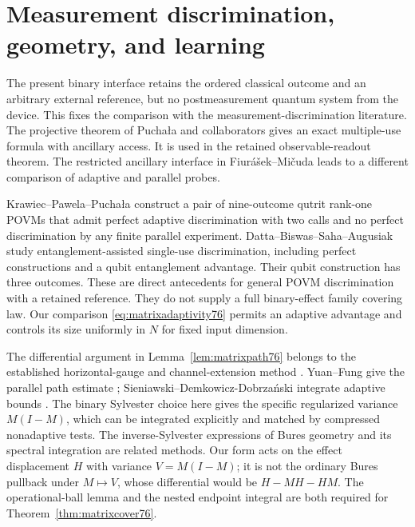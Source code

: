 \section{Measurement discrimination, geometry, and learning}
\label{sec:matrixcomparison76}
The present binary interface retains the ordered classical outcome
and an arbitrary external reference, but no postmeasurement quantum
system from the device. This fixes the comparison with the
measurement-discrimination literature. The projective theorem of
Pucha\l a and collaborators \cite[Corollary~1 and Theorem~2]{PPKKO72}
gives an exact multiple-use formula with ancillary access. It is
used in the retained observable-readout theorem. The restricted
ancillary interface in Fiur\'a\v sek--Mi\v cuda \cite{FM75} leads
to a different comparison of adaptive and parallel probes.

Krawiec--Pawela--Pucha\l a \cite[Section~4]{KPP76} construct a pair
of nine-outcome qutrit rank-one POVMs that admit perfect adaptive
discrimination with two calls and no perfect discrimination by
any finite parallel experiment. Datta--Biswas--Saha--Augusiak
\cite[Theorems~3--5]{DBSA76} study entanglement-assisted
single-use discrimination, including perfect constructions and a
qubit entanglement advantage. Their qubit construction has three
outcomes. These are direct antecedents for general POVM
discrimination with a retained reference. They do not supply a
full binary-effect family covering law. Our comparison
\eqref{eq:matrixadaptivity76} permits an adaptive advantage and
controls its size uniformly in $N$ for fixed input dimension.

The differential argument in Lemma~\ref{lem:matrixpath76} belongs
to the established horizontal-gauge and channel-extension method
\cite{FI76,DKG67,DM76,KGAD76}. Yuan--Fung give the parallel path estimate
\cite[Section~III, equation~(26), PDF version~3]{YF76};
Sieniawski--Demkowicz-Dobrza\'nski integrate adaptive bounds
\cite[Section~IV.A]{SD76}. The binary Sylvester choice here gives the
specific regularized variance $M(I-M)$, which can be integrated
explicitly and matched by compressed nonadaptive tests. The
inverse-Sylvester expressions of Bures geometry
\cite{Dittmann76} and its spectral integration
\cite{SZGeom76} are related methods. Our form acts on the effect
displacement $H$ with variance $V=M(I-M)$; it is not the ordinary
Bures pullback under $M\mapsto V$, whose differential would be
$H-MH-HM$. The operational-ball lemma and the nested endpoint
integral are both required for Theorem~\ref{thm:matrixcover76}.

